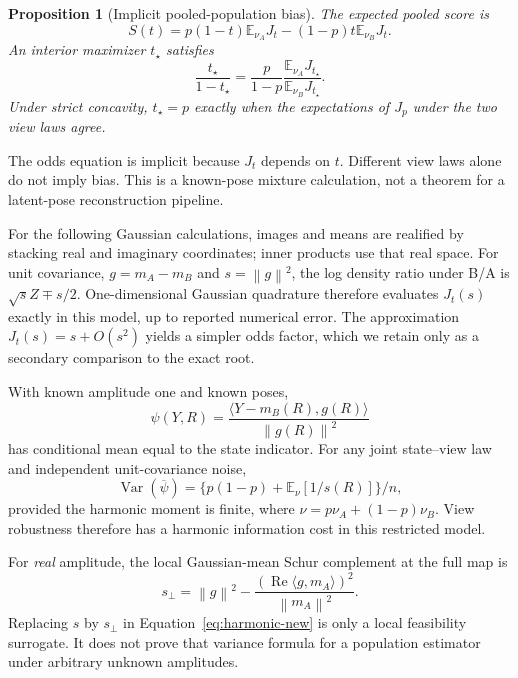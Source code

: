 \documentclass{article}
\newtheorem{proposition}{Proposition}
\newcommand{\E}{\mathbb E}
\newcommand{\norm}[1]{\left\|#1\right\|}
\newcommand{\ip}[2]{\langle #1,#2\rangle}
\begin{document}
\begin{proposition}[Implicit pooled-population bias]\label{prop:bias-new}
The expected pooled score is
\begin{equation}\label{eq:score-new}
S(t)=p(1-t)\E_{\nu_A}J_t-(1-p)t\E_{\nu_B}J_t.
\end{equation}
An interior maximizer $t_\star$ satisfies
\begin{equation}\label{eq:odds-new}
\frac{t_\star}{1-t_\star}=
\frac p{1-p}\frac{\E_{\nu_A}J_{t_\star}}{\E_{\nu_B}J_{t_\star}}.
\end{equation}
Under strict concavity, $t_\star=p$ exactly when the expectations of
$J_p$ under the two view laws agree.
\end{proposition}
The odds equation is implicit because $J_t$ depends on $t$. Different view
laws alone do not imply bias. This is a known-pose mixture calculation, not
a theorem for a latent-pose reconstruction pipeline.

For the following Gaussian calculations, images and means are realified
by stacking real and imaginary coordinates; inner products use that real
space. For unit covariance, $g=m_A-m_B$ and $s=\norm g^2$,
the log density ratio under B/A is $\sqrt{s}Z\mp s/2$.
One-dimensional Gaussian quadrature therefore evaluates $J_t(s)$ exactly
in this model, up to reported numerical error. The approximation $J_t(s)=
s+O(s^2)$ yields a simpler odds factor, which we retain only as a secondary
comparison to the exact root.

With known amplitude one and known poses,
\begin{equation}\label{eq:oracle-score-new}
\psi(Y,R)=\frac{\ip{Y-m_B(R)}{g(R)}}{\norm{g(R)}^2}
\end{equation}
has conditional mean equal to the state indicator. For any joint
state--view law and independent unit-covariance noise,
\begin{equation}\label{eq:harmonic-new}
\operatorname{Var}(\overline\psi)=
\{p(1-p)+\E_\nu[1/s(R)]\}/n,
\end{equation}
provided the harmonic moment is finite, where
$\nu=p\nu_A+(1-p)\nu_B$. View robustness therefore has a harmonic
information cost in this restricted model.

For \emph{real} amplitude, the local Gaussian-mean Schur complement at
the full map is
\begin{equation}\label{eq:amplitude-new}
s_\perp=\norm g^2-
\frac{(\operatorname{Re}\ip{g}{m_A})^2}{\norm{m_A}^2}.
\end{equation}
Replacing $s$ by $s_\perp$ in Equation~\eqref{eq:harmonic-new} is only a
local feasibility surrogate. It does not prove that variance formula for
a population estimator under arbitrary unknown amplitudes.
\end{document}
